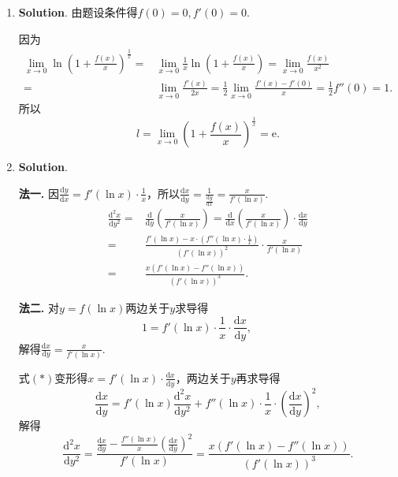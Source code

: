 \documentclass[../main.tex]{subfiles}
\begin{document}
\begin{enumerate}
    \item \textbf{Solution}. 由题设条件得$f(0)=0,f'(0)=0$.

          因为
          \[
              \begin{aligned}
                  \lim_{x\to0}\ln\left(1+\frac{f(x)}{x}\right)^{\frac{1}{x}}= {} & \lim_{x\to0}\frac{1}{x}\ln\left(1+\frac{f(x)}{x}\right)=\lim_{x\to0}\frac{f(x)}{x^2}           \\
                  = {}                                                           & \lim_{x\to0}\frac{f'(x)}{2x}=\frac{1}{2}\lim_{x\to0}\frac{f'(x)-f'(0)}{x}=\frac{1}{2}f''(0)=1.
              \end{aligned}
          \]
          所以
          \[
              l=\lim_{x\to0}\left(1+\frac{f(x)}{x}\right)^{\frac{1}{x}}=\mathrm{e}.
          \]

    \item \textbf{Solution}.

          \textbf{法一.} 因$\frac{\mathrm{d}y}{\mathrm{d}x}=f'(\ln x)\cdot\frac{1}{x}$，所以$\frac{\mathrm{d}x}{\mathrm{d}y}
              =\frac{1}{\frac{\mathrm{d}y}{\mathrm{d}x}}=\frac{x}{f'(\ln x)}$.
          \[
              \begin{aligned}
                  \frac{\mathrm{d}^{2} x}{\mathrm{d}y^{2}}= {} & \frac{\mathrm{d}}{\mathrm{d}y}\left(\frac{x}{f'(\ln x)}\right)=\frac{\mathrm{d}}{\mathrm{d}x}\left(\frac{x}{f'(\ln x)}\right)\cdot\frac{\mathrm{d}x}{\mathrm{d}y} \\
                  = {}                                         & \frac{f'(\ln x)-x\cdot\left(f''(\ln x)\cdot\frac{1}{x}\right)}{(f'(\ln x))^{2}}\cdot\frac{x}{f'(\ln x)}                                                           \\
                  = {}                                         & \frac{x(f'(\ln x)-f''(\ln x))}{(f'(\ln x))^{3}}.
              \end{aligned}
          \]

          \textbf{法二.} 对$y=f(\ln x)$两边关于$y$求导得
          \[
              1=f'(\ln x)\cdot\frac{1}{x}\cdot\frac{\mathrm{d}x}{\mathrm{d}y},\qquad\tag
              {$*$}
          \]
          解得$\frac{\mathrm{d}x}{\mathrm{d}y}=\frac{x}{f'(\ln x)}.$

          式$(*)$变形得$x=f'(\ln x)\cdot\frac{\mathrm{d}x}{\mathrm{d}y}$，两边关于$y$再求导得
          \[
              \frac{\mathrm{d}x}{\mathrm{d}y}=f'(\ln x)\frac{\mathrm{d}^{2} x}{\mathrm{d}y^{2}}
              +f''(\ln x)\cdot\frac{1}{x}\cdot\left(\frac{\mathrm{d}x}{\mathrm{d}y}\right
              )^{2},
          \]
          解得
          \[
              \frac{\mathrm{d}^{2} x}{\mathrm{d}y^{2}}=\frac{\frac{\mathrm{d}x}{\mathrm{d}y}-\frac{f''(\ln
                      x)}{x}\left(\frac{\mathrm{d}x}{\mathrm{d}y}\right)^{2}}{f'(\ln x)}=\frac{x(f'(\ln
                  x)-f''(\ln x))}{(f'(\ln x))^{3}}.
          \]


\end{enumerate}
\end{document}

